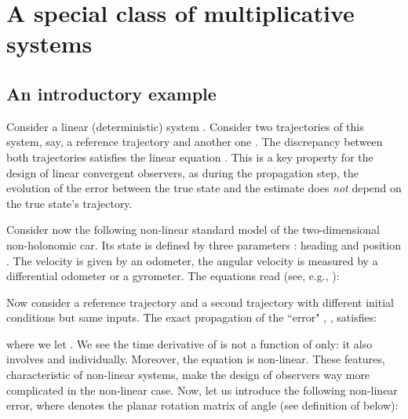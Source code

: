 \documentclass[a4paper,12pt,onecolumn]{article}
\begin{document}
 















\section{A special class of multiplicative systems}
\label{sect::deterministic}

\subsection{An introductory example}\label{introd:ex}

Consider a linear (deterministic) system . Consider two trajectories of this system, say, a reference trajectory   and another one . The  discrepancy between both trajectories  satisfies the linear equation .  This is a key property for the design of linear convergent observers, as during the propagation step, the evolution of the error between the true state and the estimate does \emph{not} depend on the true state's trajectory. 




Consider now the following non-linear standard  model of the two-dimensional non-holonomic car. Its state is defined by three parameters : heading  and position . The velocity  is given by an odometer, the angular velocity  is measured by a differential odometer or a gyrometer. The equations read (see, e.g., \cite{de1998feedback}):

Now consider a reference trajectory  and a second trajectory  with different initial conditions but same inputs. The exact propagation of the ``error" , ,  satisfies:

where we let . We see the time derivative of   is not a function of  only: it also involves  and  individually. Moreover, the equation is non-linear. These features, characteristic of non-linear systems, make the design of observers way more complicated in the non-linear case. Now, let us introduce the following non-linear error, where  denotes the planar rotation matrix of angle   (see definition of  below):
\end{document}
